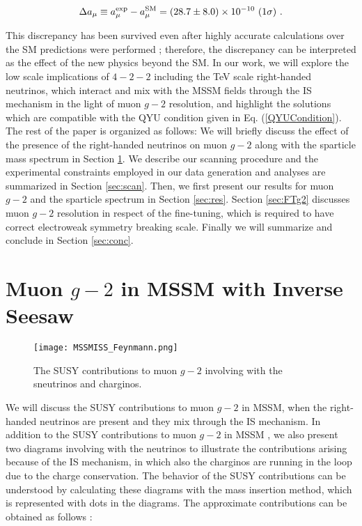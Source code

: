 \documentclass[12pt]{article}
\begin{document}
\begin{equation}
 \Delta a_{\mu}\equiv a_{\mu}^{{\rm exp}}-a_{\mu}^{{\rm SM}}=(28.7\pm 8.0)\times 10^{-10} ~(1\sigma)~.
\end{equation} 

This discrepancy has been survived even after highly accurate calculations over the SM predictions were performed \cite{Davier:2010nc}; therefore, the discrepancy can be interpreted as the effect of the new physics beyond the SM. In our work, we will explore the low scale implications of $4-2-2$ including the TeV scale right-handed neutrinos, which interact and mix with the MSSM fields through the IS mechanism in the light of muon $g-2$ resolution, and highlight the solutions which are compatible with the QYU condition given in Eq. (\ref{QYUCondition}). The rest of the paper is organized as follows: We will briefly discuss the effect of the presence of the right-handed neutrinos on muon $g-2$ along with the sparticle mass spectrum in Section \ref{sec:MSSMIS}. We describe our scanning procedure and the experimental constraints employed in our data generation and analyses are summarized in Section \ref{sec:scan}. Then, we first present our results for muon $g-2$ and the sparticle spectrum in Section \ref{sec:res}. Section \ref{sec:FTg2} discusses muon $g-2$ resolution in respect of the fine-tuning, which is required to have correct electroweak symmetry breaking scale. Finally we will summarize and conclude in Section \ref{sec:conc}.




\section{Muon $g-2$ in MSSM with Inverse Seesaw}
\label{sec:MSSMIS}

\begin{figure}[h!]
\centering
\texttt{[image: MSSMISS\_Feynmann.png]}
\caption{The SUSY contributions to muon $g-2$ involving with the sneutrinos and charginos.}
\label{fig1}
\end{figure}


We will discuss the SUSY contributions to muon $g-2$ in MSSM, when the right-handed neutrinos are present and they mix through the IS mechanism. In addition to the SUSY contributions to muon $g-2$ in MSSM \cite{Moroi:1995yh}, we also present two diagrams involving with the neutrinos to illustrate the contributions arising because of the IS mechanism, in which also the charginos are running in the loop due to the charge conservation. The behavior of the SUSY contributions can be understood by calculating these diagrams with the mass insertion method, which is represented with dots in the diagrams. The approximate contributions can be obtained as follows \cite{Khalil:2015wua}: 
\end{document}
